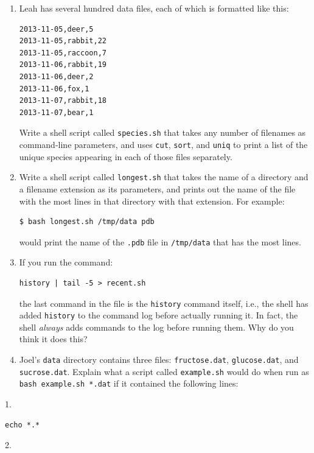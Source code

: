 \documentclass[]{book}
\begin{document}
\begin{enumerate}
\item
  Leah has several hundred data files, each of which is formatted like
  this:

\begin{verbatim}
2013-11-05,deer,5
2013-11-05,rabbit,22
2013-11-05,raccoon,7
2013-11-06,rabbit,19
2013-11-06,deer,2
2013-11-06,fox,1
2013-11-07,rabbit,18
2013-11-07,bear,1
\end{verbatim}

  Write a shell script called \texttt{species.sh} that takes any number
  of filenames as command-line parameters, and uses \texttt{cut},
  \texttt{sort}, and \texttt{uniq} to print a list of the unique species
  appearing in each of those files separately.
\item
  Write a shell script called \texttt{longest.sh} that takes the name of
  a directory and a filename extension as its parameters, and prints out
  the name of the file with the most lines in that directory with that
  extension. For example:

\begin{verbatim}
$ bash longest.sh /tmp/data pdb
\end{verbatim}

  would print the name of the \texttt{.pdb} file in \texttt{/tmp/data}
  that has the most lines.
\item
  If you run the command:

\begin{verbatim}
history | tail -5 > recent.sh
\end{verbatim}

  the last command in the file is the \texttt{history} command itself,
  i.e., the shell has added \texttt{history} to the command log before
  actually running it. In fact, the shell \emph{always} adds commands to
  the log before running them. Why do you think it does this?
\item
  Joel's \texttt{data} directory contains three files:
  \texttt{fructose.dat}, \texttt{glucose.dat}, and \texttt{sucrose.dat}.
  Explain what a script called \texttt{example.sh} would do when run as
  \texttt{bash example.sh *.dat} if it contained the following lines:
\end{enumerate}

1.

\begin{verbatim}
echo *.*
\end{verbatim}

2.
\end{document}

